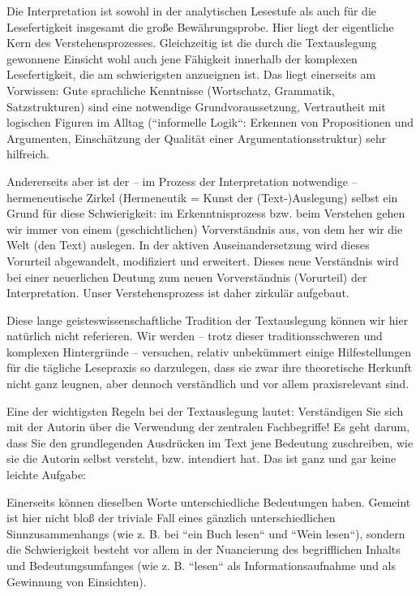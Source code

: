 \documentclass[]{book}
\theoremstyle{definition}
\theoremstyle{definition}
\theoremstyle{definition}
\theoremstyle{remark}
\begin{document}
Die Interpretation ist sowohl in der analytischen Lesestufe als auch für
die Lesefertigkeit insgesamt die große Bewährungsprobe. Hier liegt der
eigentliche Kern des Verstehensprozesses. Gleichzeitig ist die durch die
Textauslegung gewonnene Einsicht wohl auch jene Fähigkeit innerhalb der
komplexen Lesefertigkeit, die am schwierigsten anzueignen ist. Das liegt
einerseits am Vorwissen: Gute sprachliche Kenntnisse (Wortschatz,
Grammatik, Satzstrukturen) sind eine notwendige Grundvoraussetzung,
Vertrautheit mit logischen Figuren im Alltag (``informelle Logik``:
Erkennen von Propositionen und Argumenten, Einschätzung der Qualität
einer Argumentationsstruktur) sehr hilfreich.

Andererseits aber ist der -- im Prozess der Interpretation notwendige --
hermeneutische Zirkel (Hermeneutik = Kunst der (Text-)Auslegung) selbst
ein Grund für diese Schwierigkeit: im Erkenntnisprozess bzw. beim
Verstehen gehen wir immer von einem (geschichtlichen) Vorverständnis
aus, von dem her wir die Welt (den Text) auslegen. In der aktiven
Auseinandersetzung wird dieses Vorurteil abgewandelt, modifiziert und
erweitert. Dieses neue Verständnis wird bei einer neuerlichen Deutung
zum neuen Vorverständnis (Vorurteil) der Interpretation. Unser
Verstehensprozess ist daher zirkulär aufgebaut.

Diese lange geisteswissenschaftliche Tradition der Textauslegung können
wir hier natürlich nicht referieren. Wir werden -- trotz dieser
traditionsschweren und komplexen Hintergründe -- versuchen, relativ
unbekümmert einige Hilfestellungen für die tägliche Lesepraxis so
darzulegen, dass sie zwar ihre theoretische Herkunft nicht ganz leugnen,
aber dennoch verständlich und vor allem praxisrelevant sind.

Eine der wichtigsten Regeln bei der Textauslegung lautet: Verständigen
Sie sich mit der Autorin über die Verwendung der zentralen Fachbegriffe!
Es geht darum, dass Sie den grundlegenden Ausdrücken im Text jene
Bedeutung zuschreiben, wie sie die Autorin selbst versteht, bzw.
intendiert hat. Das ist ganz und gar keine leichte Aufgabe:

Einerseits können dieselben Worte unterschiedliche Bedeutungen haben.
Gemeint ist hier nicht bloß der triviale Fall eines gänzlich
unterschiedlichen Sinnzusammenhangs (wie z. B. bei ``ein Buch lesen``
und ``Wein lesen``), sondern die Schwierigkeit besteht vor allem in der
Nuancierung des begrifflichen Inhalts und Bedeutungsumfanges (wie z. B.
``lesen`` als Informationsaufnahme und als Gewinnung von Einsichten).
\end{document}
